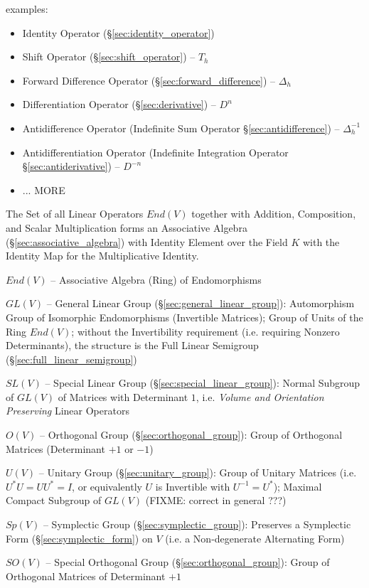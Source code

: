 examples:
\begin{itemize}
  \item Identity Operator (\S\ref{sec:identity_operator})
  \item Shift Operator (\S\ref{sec:shift_operator}) -- $T_h$
  \item Forward Difference Operator (\S\ref{sec:forward_difference}) --
    $\Delta_h$
  \item Differentiation Operator (\S\ref{sec:derivative}) -- $D^n$
  \item Antidifference Operator (Indefinite Sum Operator
    \S\ref{sec:antidifference}) -- $\Delta^{-1}_h$
  \item Antidifferentiation Operator (Indefinite Integration Operator
    \S\ref{sec:antiderivative}) -- $D^{-n}$
  \item ... MORE
\end{itemize}

The Set of all Linear Operators $End(V)$ together with Addition, Composition,
and Scalar Multiplication forms an Associative Algebra
(\S\ref{sec:associative_algebra}) with Identity Element over the Field $K$ with
the Identity Map for the Multiplicative Identity.

$End(V)$ -- Associative Algebra (Ring) of Endomorphisms

$GL(V)$ -- General Linear Group (\S\ref{sec:general_linear_group}):
Automorphism Group of Isomorphic Endomorphisms (Invertible Matrices); Group of
Units of the Ring $End(V)$; without the Invertibility requirement (i.e.
requiring Nonzero Determinants), the structure is the Full Linear Semigroup
(\S\ref{sec:full_linear_semigroup})

$SL(V)$ -- Special Linear Group (\S\ref{sec:special_linear_group}): Normal
Subgroup of $GL(V)$ of Matrices with Determinant $1$, i.e. \emph{Volume and
  Orientation Preserving} Linear Operators

$O(V)$ -- Orthogonal Group (\S\ref{sec:orthogonal_group}): Group of Orthogonal
Matrices (Determinant $+1$ or $-1$)

$U(V)$ -- Unitary Group (\S\ref{sec:unitary_group}): Group of Unitary Matrices
(i.e. $U^*U = UU^* = I$, or equivalently $U$ is Invertible with $U^{-1} =
U^*$); Maximal Compact Subgroup of $GL(V)$ (FIXME: correct in general ???)

$Sp(V)$ -- Symplectic Group (\S\ref{sec:symplectic_group}): Preserves a
Symplectic Form (\S\ref{sec:symplectic_form}) on $V$ (i.e. a Non-degenerate
Alternating Form)

$SO(V)$ -- Special Orthogonal Group (\S\ref{sec:orthogonal_group}): Group of
Orthogonal Matrices of Determinant $+1$

